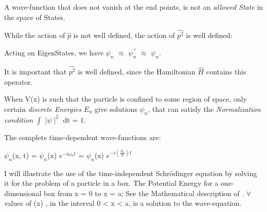 \documentclass[a4paper, 10pt, onepage]{elegantbook}
\begin{document}
{A wave-function that does not vanish at the end points, is not an \emph{allowed State} in the space of States.  

While the action of $\hat{p}$ is not well defined, the action of $\hat{p^2}$ is well defined:  

Acting on EigenStates, we have $\psi_n$ $\approx$ $\psi_n^{''}$ $\approx$ $\psi_n$.  

It is important that $\hat{p^2}$ is well defined, since the Hamiltonian $\hat{H}$ contains this operator.  

When V(x) is such that the particle is confined to some region of space, only certain \emph{discrete Energies} $E_n$ 
give solutions $\psi_n$, that can satisfy the \emph{Normalization condition} $\int$ $\mid \psi \mid^2$ dt = $1$.  

The complete time-dependent wave-functions are:  

$\psi_n$(x, t) = $\psi_n$(x) $e^{-i \omega_n t}$ = $\psi_n$(x) $e^{-i(\frac{E_n}{h})t}$  

I will illustrate the use of the time-independent Schr\"odinger equation by solving it for the problem of a 
particle in a box. The Potential Energy for a one-dimensional box from x = 0 to x = a; See the Mathematical description 
of \pageref{Harmonic Oscillator}. $\forall$ values of (x) , in the interval 0 < x < a, is a solution to the 
wave-equation. 

\begin{figure}[h!]
\centering
{}
\end{figure}}
\end{document}
